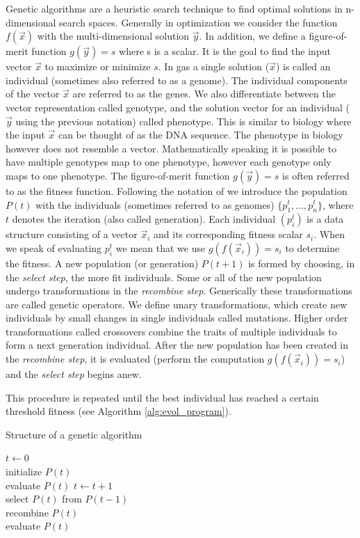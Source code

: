 Genetic algorithms are a heuristic search technique to find optimal solutions in n-dimensional search spaces. Generally in optimization we consider the function $f(\vec{x})$ with the multi-dimensional solution $\vec{y}$. In addition, we define a figure-of-merit function $g(\vec{y})=s$ where s is a scalar. It is the goal to find the input vector $\vec{x}$  to maximize or minimize $s$. In \glspl{ga} a single solution ($\vec{x}$) is called an individual (sometimes also referred to as a genome). The individual components of the vector $\vec{x}$ are referred to as the genes. We also differentiate between the vector representation called genotype, and the solution vector for an individual ($\vec{y}$ using the previous notation) called phenotype. This is similar to biology where the input $\vec{x}$ can be thought of as the DNA sequence. The phenotype in biology however does not resemble a vector.  Mathematically speaking it is possible to have multiple genotypes map to one phenotype, however each genotype only maps to one phenotype. The figure-of-merit function $g(\vec{y})=s$ is often referred to as the fitness function. 
Following the notation of \citep{Michalewicz:1994:GAD:184675} we introduce the population $P(t)$ with the individuals (sometimes referred to as genomes) $\{p_{1}^{t}, \dots, p_{n}^{t}\}$, where $t$ denotes the iteration (also called generation). Each individual $(p_{i}^t)$ is a data structure consisting of a vector $\vec{x}_i$ and its corresponding fitness scalar $s_i$.  When we speak of evaluating $p_{i}^{t}$ we mean that we use $g(f(\vec{x}_i))=s_i$ to determine the fitness. A new population (or generation) $P(t+1)$ is formed by choosing,  in the \textit{select step}, the more fit individuals. Some or all of the new population undergo transformations in the \textit{recombine step}. Generically these transformations are called genetic operators. We define unary transformations, which create new individuals by small changes in single individuals called mutations. Higher order transformations called crossovers combine the traits of multiple individuals to form a next generation individual. 
After the new population has been created in the \textit{recombine step}, it is evaluated (perform the computation $g(f(\vec{x}_i))=s_i$) and the \textit{select step} begins anew. 

This procedure is repeated until the best individual has reached a certain threshold fitness (see Algorithm \ref{alg:evol_program}). 



\begin{algorithm}
\label{alg:evol_program}
\caption{Structure of a genetic algorithm}
\begin{algorithmic}
\STATE $t \gets 0$\\
initialize $P(t)$\\
evaluate $P(t)$
\STATE $t \gets t+1$\\
select $P(t)$ from $P(t-1)$\\
recombine $P(t)$\\
evaluate $P(t)$
\ENDWHILE
\end{algorithmic}
\end{algorithm}

